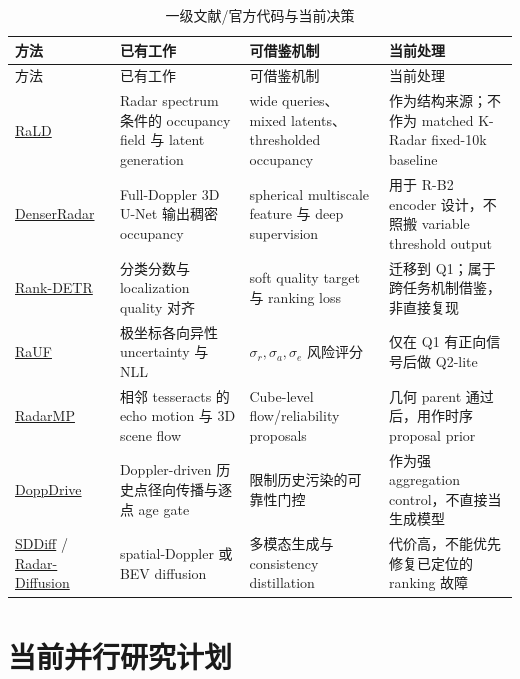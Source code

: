\documentclass[11pt,a4paper,fontset=none]{ctexart}
\begin{document}
\begin{longtable}{p{2.7cm} p{4.1cm} p{4.4cm} p{3.5cm}}
\caption{一级文献/官方代码与当前决策}\\
\toprule
方法 & 已有工作 & 可借鉴机制 & 当前处理 \\
\midrule
\endfirsthead
\toprule
方法 & 已有工作 & 可借鉴机制 & 当前处理 \\
\midrule
\endhead
\href{https://arxiv.org/abs/2511.07067}{RaLD} &
Radar spectrum 条件的 occupancy field 与 latent generation &
wide queries、mixed latents、thresholded occupancy &
作为结构来源；不作为 matched K-Radar fixed-10k baseline \\

\href{https://arxiv.org/abs/2405.05131}{DenserRadar} &
Full-Doppler 3D U-Net 输出稠密 occupancy &
spherical multiscale feature 与 deep supervision &
用于 R-B2 encoder 设计，不照搬 variable threshold output \\

\href{https://proceedings.neurips.cc/paper_files/paper/2023/file/34074479ee2186a9f236b8fd03635372-Paper-Conference.pdf}{Rank-DETR} &
分类分数与 localization quality 对齐 &
soft quality target 与 ranking loss &
迁移到 Q1；属于跨任务机制借鉴，非直接复现 \\

\href{https://openaccess.thecvf.com/content/CVPR2026/papers/Wang_RaUF_Learning_the_Spatial_Uncertainty_Field_of_Radar_CVPR_2026_paper.pdf}{RaUF} &
极坐标各向异性 uncertainty 与 NLL &
$\sigma_r,\sigma_a,\sigma_e$ 风险评分 &
仅在 Q1 有正向信号后做 Q2-lite \\

\href{https://arxiv.org/abs/2511.12117}{RadarMP} &
相邻 tesseracts 的 echo motion 与 3D scene flow &
Cube-level flow/reliability proposals &
几何 parent 通过后，用作时序 proposal prior \\

\href{https://arxiv.org/abs/2508.12330}{DoppDrive} &
Doppler-driven 历史点径向传播与逐点 age gate &
限制历史污染的可靠性门控 &
作为强 aggregation control，不直接当生成模型 \\

\href{https://www.ijcai.org/proceedings/2025/979}{SDDiff} /
\href{https://arxiv.org/abs/2403.08460}{Radar-Diffusion} &
spatial-Doppler 或 BEV diffusion &
多模态生成与 consistency distillation &
代价高，不能优先修复已定位的 ranking 故障 \\
\bottomrule
\end{longtable}

\section{当前并行研究计划}
\end{document}
